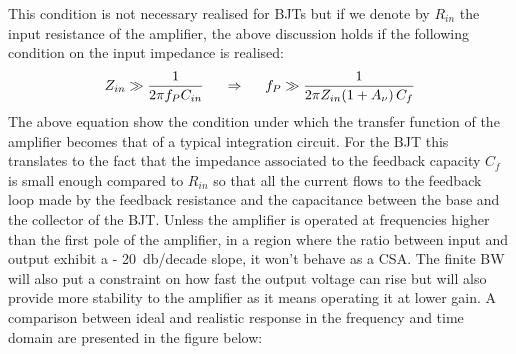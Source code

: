 		This condition is not necessary realised for BJTs but if we denote by $R_{in}$ the input resistance of the amplifier, the above discussion holds if the following condition on the input impedance is realised:
		\begin{equation}
			Z_{in} \gg \frac{1}{2 \pi f_P C_{in}} \hspace{5mm} \Rightarrow \hspace{5mm} f_P \gg \frac{1}{2\pi Z_{in} {\left( 1 + A_\nu \right)C_f}}
		\end{equation}
		The above equation show the condition under which the transfer function of the amplifier becomes that of a typical integration circuit. For the BJT this translates to the fact that the impedance associated to the feedback capacity $C_f$ is small enough compared to $R_{in}$ so that all the current flows to the feedback loop made by the feedback resistance and the capacitance between the base and the collector of the BJT. Unless the amplifier is operated at frequencies higher than the first pole of the amplifier, in a region where the ratio between input and output exhibit a - \SI{20}{\decibel}/decade slope, it won't behave as a CSA. The finite BW will also put a constraint on how fast the output voltage can rise but will also provide more stability to the amplifier as it means operating it at lower gain. A comparison between ideal and realistic response in the frequency and time domain are presented in the figure below:  
		
